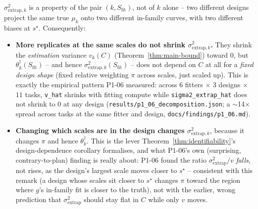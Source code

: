 \begin{remark}
\label{rem:design-dependence}
$\sigma^2_{\mathrm{extrap}, k}$ is a property of the pair $(k, S_{\mathrm{fit}})$, not
of $k$ alone -- two different designs project the same true $\mu_k$ onto two different
in-family curves, with two different biases at $s^\star$. Consequently:
\begin{itemize}
  \item \textbf{More replicates at the same scales do not shrink
    $\sigma^2_{\mathrm{extrap}, k}$.} They shrink the \emph{estimation} variance
    $v_k(C)$ (Theorem~\ref{thm:main-bound}) toward $0$, but
    $\theta_k^{\dagger}(S_{\mathrm{fit}})$ -- and hence
    $\sigma^2_{\mathrm{extrap}, k}(S_{\mathrm{fit}})$ -- does not depend on $C$ at all
    for a \emph{fixed design shape} (fixed relative weighting $\pi$ across scales, just
    scaled up). This is exactly the empirical pattern P1-06 measured: across
    $6$ fitters $\times$ $3$ designs $\times$ $11$ tasks, \texttt{v\_hat} shrinks with
    fitting compute while \texttt{sigma2\_extrap\_hat} does not shrink to $0$ at any
    design (\texttt{results/p1\_06\_decomposition.json}; a $\sim$14$\times$ spread
    across tasks at the same fitter and design, \texttt{docs/findings/p1\_06.md}).
  \item \textbf{Changing which scales are in the design changes
    $\sigma^2_{\mathrm{extrap}, k}$}, because it changes $\pi$ and hence
    $\theta_k^{\dagger}$. This is the lever Theorem~\ref{thm:identifiability}'s
    design-dependence corollary formalises, and what P1-06's own (surprising,
    contrary-to-plan) finding is really about: P1-06 found the ratio
    $\sigma^2_{\mathrm{extrap}} / v$ \emph{falls}, not rises, as the design's largest
    scale moves closer to $s^\star$ -- consistent with this remark (a design whose
    scales sit closer to $s^\star$ changes $\pi$ toward the region where $g$'s
    in-family fit is closer to the truth), not with the earlier, wrong prediction that
    $\sigma^2_{\mathrm{extrap}}$ should stay flat in $C$ while only $v$ moves.
\end{itemize}
\end{remark}


